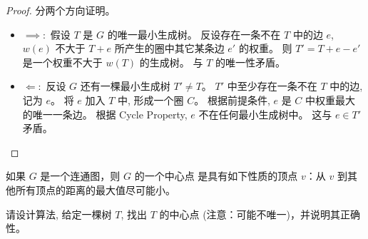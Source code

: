 \documentclass[a4paper, justified]{tufte-handout}
\begin{document}
\begin{proof}
  分两个方向证明。
  \begin{itemize}
    \item $\implies:$ 假设 $T$ 是 $G$ 的唯一最小生成树。
      反设存在一条不在 $T$ 中的边 $e$,
      $w(e)$ 不大于 $T + e$ 所产生的圈中其它某条边 $e'$ 的权重。
      则 $T' = T + e - e'$ 是一个权重不大于 $w(T)$ 的生成树。
      与 $T$ 的唯一性矛盾。
    \item $\Longleftarrow:$ 反设 $G$ 还有一棵最小生成树 $T' \neq T$。
      $T'$ 中至少存在一条不在 $T$ 中的边, 记为 $e$。
      将 $e$ 加入 $T$ 中, 形成一个圈 $C$。
      根据前提条件, $e$ 是 $C$ 中权重最大的唯一一条边。
      根据 Cycle Property, $e$ 不在任何最小生成树中。
      这与 $e \in T'$ 矛盾。
  \end{itemize}
\end{proof}

\begin{problem}[树的中心点]
  如果 $G$ 是一个连通图，则 $G$ 的一个中心点
  是具有如下性质的顶点 $v$：从 $v$ 到其他所有顶点的距离的最大值尽可能小。

  \noindent 请设计算法, 给定一棵树 $T$, 找出 $T$ 的中心点
  (注意：可能不唯一)，并说明其正确性。
\end{problem}
\end{document}
